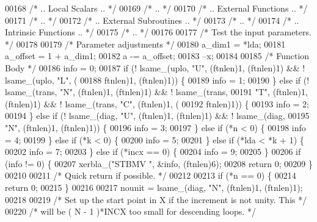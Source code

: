 \begin{DoxyCode}
00168 \textcolor{comment}{/*     .. Local Scalars .. */}
00169 \textcolor{comment}{/*     .. */}
00170 \textcolor{comment}{/*     .. External Functions .. */}
00171 \textcolor{comment}{/*     .. */}
00172 \textcolor{comment}{/*     .. External Subroutines .. */}
00173 \textcolor{comment}{/*     .. */}
00174 \textcolor{comment}{/*     .. Intrinsic Functions .. */}
00175 \textcolor{comment}{/*     .. */}
00176 
00177 \textcolor{comment}{/*     Test the input parameters. */}
00178 
00179     \textcolor{comment}{/* Parameter adjustments */}
00180     a\_dim1 = *lda;
00181     a\_offset = 1 + a\_dim1;
00182     a -= a\_offset;
00183     --x;
00184 
00185     \textcolor{comment}{/* Function Body */}
00186     info = 0;
00187     \textcolor{keywordflow}{if} (! lsame\_(uplo, \textcolor{stringliteral}{"U"}, (ftnlen)1, (ftnlen)1) && ! lsame\_(uplo, \textcolor{stringliteral}{"L"}, (
00188         ftnlen)1, (ftnlen)1)) \{
00189     info = 1;
00190     \} \textcolor{keywordflow}{else} \textcolor{keywordflow}{if} (! lsame\_(trans, \textcolor{stringliteral}{"N"}, (ftnlen)1, (ftnlen)1) && ! lsame\_(trans, 
00191         \textcolor{stringliteral}{"T"}, (ftnlen)1, (ftnlen)1) && ! lsame\_(trans, \textcolor{stringliteral}{"C"}, (ftnlen)1, (
00192         ftnlen)1)) \{
00193     info = 2;
00194     \} \textcolor{keywordflow}{else} \textcolor{keywordflow}{if} (! lsame\_(diag, \textcolor{stringliteral}{"U"}, (ftnlen)1, (ftnlen)1) && ! lsame\_(diag, 
00195         \textcolor{stringliteral}{"N"}, (ftnlen)1, (ftnlen)1)) \{
00196     info = 3;
00197     \} \textcolor{keywordflow}{else} \textcolor{keywordflow}{if} (*n < 0) \{
00198     info = 4;
00199     \} \textcolor{keywordflow}{else} \textcolor{keywordflow}{if} (*k < 0) \{
00200     info = 5;
00201     \} \textcolor{keywordflow}{else} \textcolor{keywordflow}{if} (*lda < *k + 1) \{
00202     info = 7;
00203     \} \textcolor{keywordflow}{else} \textcolor{keywordflow}{if} (*incx == 0) \{
00204     info = 9;
00205     \}
00206     \textcolor{keywordflow}{if} (info != 0) \{
00207     xerbla\_(\textcolor{stringliteral}{"STBMV "}, &info, (ftnlen)6);
00208     \textcolor{keywordflow}{return} 0;
00209     \}
00210 
00211 \textcolor{comment}{/*     Quick return if possible. */}
00212 
00213     \textcolor{keywordflow}{if} (*n == 0) \{
00214     \textcolor{keywordflow}{return} 0;
00215     \}
00216 
00217     nounit = lsame\_(diag, \textcolor{stringliteral}{"N"}, (ftnlen)1, (ftnlen)1);
00218 
00219 \textcolor{comment}{/*     Set up the start point in X if the increment is not unity. This */}
00220 \textcolor{comment}{/*     will be  ( N - 1 )*INCX   too small for descending loops. */}

\end{DoxyCode}

